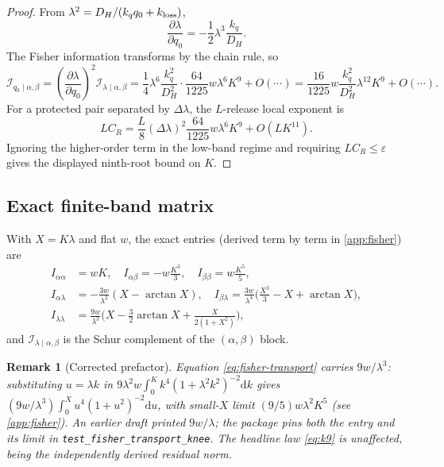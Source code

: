 \documentclass[11pt]{article}
\newtheorem{remark}{Remark}
\newcommand{\dd}{\mathrm{d}}
\newcommand{\eps}{\varepsilon}
\newcommand{\calI}{\mathcal I}
\begin{document}
\begin{proof}
From \(\lambda^2=D_H/(k_qq_0+k_{\rm loss})\),
\[
\frac{\partial\lambda}{\partial q_0}
=-\frac12\lambda^3\frac{k_q}{D_H}.
\]
The Fisher information transforms by the chain rule, so
\[
\calI_{q_0\mid\alpha,\beta}
=\left(\frac{\partial\lambda}{\partial q_0}\right)^2
\calI_{\lambda\mid\alpha,\beta}
=\frac14\lambda^6\frac{k_q^2}{D_H^2}\cdot
\frac{64}{1225}w\lambda^6K^9+O(\cdots)
=\frac{16}{1225}w\frac{k_q^2}{D_H^2}\lambda^{12}K^9+O(\cdots).
\]
For a protected pair separated by \(\Delta\lambda\), the \(L\)-release local exponent is
\[
LC_R=\frac{L}{8}(\Delta\lambda)^2\frac{64}{1225}w\lambda^6K^9+O(LK^{11}).
\]
Ignoring the higher-order term in the low-band regime and requiring \(LC_R\le\eps\) gives the displayed ninth-root bound on \(K\).
\end{proof}

\subsection{Exact finite-band matrix}

With \(X=K\lambda\) and flat \(w\), the exact entries (derived term by term in \cref{app:fisher}) are
\begin{align}
I_{\alpha\alpha}&=wK,\quad I_{\alpha\beta}=-w\tfrac{K^3}{3},\quad I_{\beta\beta}=w\tfrac{K^5}{5},\label{eq:fisher-basic}\\
I_{\alpha\lambda}&=-\tfrac{3w}{\lambda^2}(X-\arctan X),\quad
I_{\beta\lambda}=\tfrac{3w}{\lambda^4}\big(\tfrac{X^3}{3}-X+\arctan X\big),\label{eq:fisher-cross}\\
I_{\lambda\lambda}&=\frac{9w}{\lambda^3}\Big(X-\tfrac32\arctan X+\tfrac{X}{2(1+X^2)}\Big),
\label{eq:fisher-transport}
\end{align}
and \(\calI_{\lambda\mid\alpha,\beta}\) is the Schur complement of the \((\alpha,\beta)\) block.

\begin{remark}[Corrected prefactor]
\label{rem:correction}
Equation \eqref{eq:fisher-transport} carries \(9w/\lambda^3\): substituting \(u=\lambda k\) in \(9\lambda^2w\int_0^K k^4(1+\lambda^2k^2)^{-2}\dd k\) gives \((9w/\lambda^3)\int_0^X u^4(1+u^2)^{-2}\dd u\), with small-\(X\) limit \((9/5)w\lambda^2K^5\) (see \cref{app:fisher}). An earlier draft printed \(9w/\lambda\); the package pins both the entry and its limit in \texttt{test\_fisher\_transport\_knee}. The headline law \eqref{eq:k9} is unaffected, being the independently derived residual norm.
\end{remark}
\end{document}
